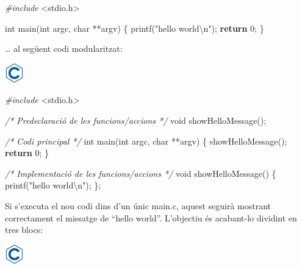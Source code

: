 \documentclass[]{book}
\newenvironment{Shaded}{\begin{snugshade}}{\end{snugshade}}
\newcommand{\DataTypeTok}[1]{\textcolor[rgb]{0.13,0.29,0.53}{#1}}
\newcommand{\DecValTok}[1]{\textcolor[rgb]{0.00,0.00,0.81}{#1}}
\newcommand{\SpecialCharTok}[1]{\textcolor[rgb]{0.00,0.00,0.00}{#1}}
\newcommand{\StringTok}[1]{\textcolor[rgb]{0.31,0.60,0.02}{#1}}
\newcommand{\ImportTok}[1]{#1}
\newcommand{\CommentTok}[1]{\textcolor[rgb]{0.56,0.35,0.01}{\textit{#1}}}
\newcommand{\ControlFlowTok}[1]{\textcolor[rgb]{0.13,0.29,0.53}{\textbf{#1}}}
\newcommand{\PreprocessorTok}[1]{\textcolor[rgb]{0.56,0.35,0.01}{\textit{#1}}}
\newcommand{\NormalTok}[1]{#1}
\begin{document}
\begin{Shaded}
\begin{Highlighting}[]
\PreprocessorTok{#include }\ImportTok{<stdio.h>}

\DataTypeTok{int}\NormalTok{ main(}\DataTypeTok{int}\NormalTok{ argc, }\DataTypeTok{char}\NormalTok{ **argv) \{}
\NormalTok{    printf(}\StringTok{"hello world}\SpecialCharTok{\textbackslash{}n}\StringTok{"}\NormalTok{);}
    \ControlFlowTok{return} \DecValTok{0}\NormalTok{;}
\NormalTok{\}}
\end{Highlighting}
\end{Shaded}

\ldots{} al següent codi modularitzat:

\includegraphics{./img/c.png}

\begin{Shaded}
\begin{Highlighting}[]
\PreprocessorTok{#include }\ImportTok{<stdio.h>}

\CommentTok{/* Predeclaració de les funcions/accions */}
\DataTypeTok{void}\NormalTok{ showHelloMessage();}

\CommentTok{/* Codi principal */}
\DataTypeTok{int}\NormalTok{ main(}\DataTypeTok{int}\NormalTok{ argc, }\DataTypeTok{char}\NormalTok{ **argv) \{}
\NormalTok{    showHelloMessage();}
    \ControlFlowTok{return} \DecValTok{0}\NormalTok{;}
\NormalTok{\}}

\CommentTok{/* Implementació de les funcions/accions */}
\DataTypeTok{void}\NormalTok{ showHelloMessage() \{}
\NormalTok{    printf(}\StringTok{"hello world}\SpecialCharTok{\textbackslash{}n}\StringTok{"}\NormalTok{);}
\NormalTok{\};}
\end{Highlighting}
\end{Shaded}

Si s'executa el nou codi dins d'un únic main.c, aquest seguirà mostrant
correctament el missatge de ``hello world''. L'objectiu és acabant-lo
dividint en tres blocs:

\includegraphics{./img/c.png}
\end{document}
